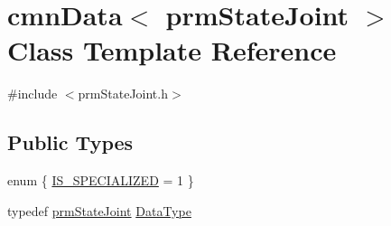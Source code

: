 \hypertarget{classcmn_data_3_01prm_state_joint_01_4}{\section{cmn\-Data$<$ prm\-State\-Joint $>$ Class Template Reference}
\label{classcmn_data_3_01prm_state_joint_01_4}
}


{\ttfamily \#include $<$prm\-State\-Joint.\-h$>$}

\subsection*{Public Types}
\begin{DoxyCompactItemize}
\item 
enum \{ \hyperlink{classcmn_data_3_01prm_state_joint_01_4_a1d1237281c6e25baeb93e9ea798bc92aaa934d528ddfbb88038068e2b92f04c0b}{I\-S\-\_\-\-S\-P\-E\-C\-I\-A\-L\-I\-Z\-E\-D} = 1
 \}
\item 
typedef \hyperlink{classprm_state_joint}{prm\-State\-Joint} \hyperlink{classcmn_data_3_01prm_state_joint_01_4_a65f7d3cb2fc06e658c5fc9f417b585ee}{Data\-Type}
\end{DoxyCompactItemize}
